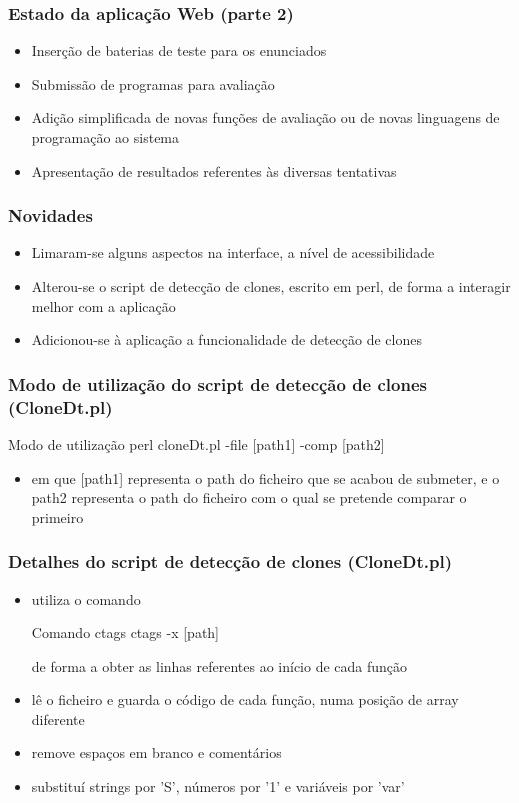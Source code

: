 \documentclass{beamer}
\begin{document}
\begin{frame}[fragile] \frametitle{Estado da aplicação Web (parte 2)}
\begin{itemize}
\item Inserção de baterias de teste para os enunciados
\item Submissão de programas para avaliação
\item Adição simplificada de novas funções de avaliação ou de novas linguagens de programação ao sistema
\item Apresentação de resultados referentes às diversas tentativas
\end{itemize}
\end{frame}

\begin{frame}[fragile] \frametitle{Novidades}
\begin{itemize}
\item Limaram-se alguns aspectos na interface, a nível de acessibilidade
\item Alterou-se o script de detecção de clones, escrito em perl, de forma a interagir melhor com a aplicação
\item Adicionou-se à aplicação a funcionalidade de detecção de clones
\end{itemize}
\end{frame}

\begin{frame}[fragile] \frametitle{Modo de utilização do script de detecção de clones (CloneDt.pl)}
\begin{block}{Modo de utilização}
perl cloneDt.pl -file [path1] -comp [path2]
\end{block}
\begin{itemize}
\item em que [path1] representa o path do ficheiro que se acabou de submeter, e o path2 representa o path do ficheiro com o qual se pretende comparar o primeiro 
\end{itemize}
\end{frame}


\begin{frame}[fragile] \frametitle{Detalhes do script de detecção de clones (CloneDt.pl)}
\begin{itemize}
\item utiliza o comando 
\begin{block}{Comando ctags}
ctags -x [path]
\end{block}
de forma a obter as linhas referentes ao início de cada função
\item lê o ficheiro e guarda o código de cada função, numa posição de array diferente
\item remove espaços em branco e comentários
\item substituí strings por 'S', números por '1' e variáveis por 'var' 
\end{itemize}
\end{frame}
\end{document}
